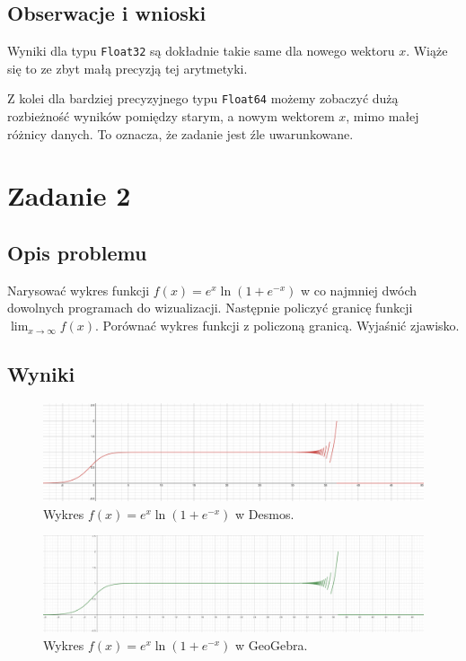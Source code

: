 \documentclass{article}
\begin{document}
\subsection{Obserwacje i wnioski}
Wyniki dla typu \texttt{Float32} są dokładnie takie same dla nowego wektoru $x$. Wiąże się to ze zbyt małą precyzją tej
arytmetyki.

Z kolei dla bardziej precyzyjnego typu \texttt{Float64} możemy zobaczyć dużą rozbieżność wyników pomiędzy starym, a
nowym wektorem $x$, mimo małej różnicy danych. To oznacza, że zadanie jest źle uwarunkowane.

\section{Zadanie 2}
\subsection{Opis problemu}
Narysować wykres funkcji $f(x) = e^{x}\ln(1 + e^{-x})$ w co najmniej dwóch dowolnych
programach do wizualizacji. Następnie policzyć granicę funkcji $\lim_{x \to \infty} f(x)$. Porównać
wykres funkcji z policzoną granicą. Wyjaśnić zjawisko.

\subsection{Wyniki}
\begin{figure}[H]
\centering
\includegraphics[width=\textwidth]{Desmos.png}
\caption{Wykres $f(x) = e^{x}\ln(1 + e^{-x})$ w Desmos.}
\end{figure}

\begin{figure}[H]
\centering
\includegraphics[width=\textwidth]{GeoGebra.png}
\caption{Wykres $f(x) = e^{x}\ln(1 + e^{-x})$ w GeoGebra.}
\end{figure}
\end{document}
